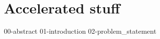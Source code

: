 \chapter{\label{ch:accelerator}Accelerated stuff}

{00-abstract}
{01-introduction}
{02-problem_statement}

